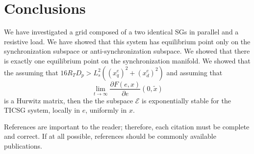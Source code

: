 \documentclass[letterpaper, 10 pt, conference]{ieeeconf}  %
\begin{document}
\section{Conclusions}

We have investigated  a grid composed of a two identical SGs in parallel and a resistive load. We have showed that this system has equilibrium point only on the synchronization subspace or anti-synchronization subspace. We showed that there is exactly one equilibrium point on the synchronization manifold. We showed that the assuming that $16 R_T D_p > L_s^2\left(\left(x_q^e\right)^2 +  \left(x_d^e\right)^2 \right)$  and assuming that 
$$\lim_{t \to \infty} \frac{\partial F(e,x)}{\partial e}\left(0,\tilde{x}\right) $$ is a Hurwitz matrix, then the the subspace $\mathscr{E}$ is exponentially stable for the TICSG system, locally in $e$, uniformly in $x$.

References are important to the reader; therefore, each citation must be complete and correct. If at all possible, references should be commonly available publications.
\end{document}
